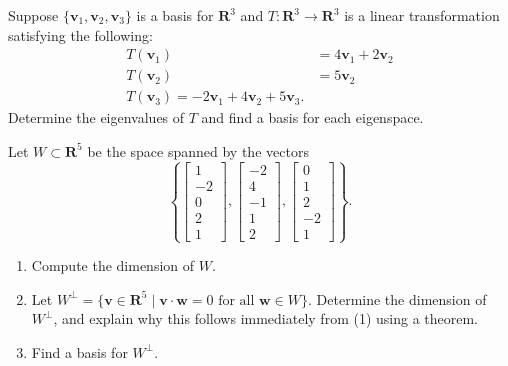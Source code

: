 \documentclass[11pt,twoside,openany]{memoir}
\begin{document}
    \begin{exercise}
        Suppose $\{\mathbf{v}_1,\mathbf{v}_2,\mathbf{v}_3\}$ is a basis for $\mathbf{R}^3$ and $T:\mathbf{R}^3\to \mathbf{R}^3$ is a linear transformation satisfying the following:
            \begin{equation*}
            \begin{split}
                T(\mathbf{v}_1) &= 4\mathbf{v}_1+2\mathbf{v}_2 \\
                T(\mathbf{v}_2) &= 5\mathbf{v}_2 \\
                T(\mathbf{v}_3) = -2\mathbf{v}_1+4\mathbf{v}_2+5\mathbf{v}_3.
            \end{split}
            \end{equation*}
        Determine the eigenvalues of $T$ and find a basis for each eigenspace.
        \end{exercise}
        
        \begin{exercise}
        Let $W\subset \mathbf{R}^5$ be the space spanned by the vectors
        \[
        \left\{\begin{bmatrix} 1 \\ -2 \\ 0 \\ 2 \\ 1 \end{bmatrix},\begin{bmatrix} -2 \\ 4 \\ -1 \\ 1 \\ 2\end{bmatrix}, \begin{bmatrix} 0 \\ 1 \\ 2 \\ -2 \\1\end{bmatrix}\right\}.\]

        \begin{enumerate}[label = (\arabic*)]
            \item Compute the dimension of $W$.
            \item Let $W^{\perp}=\{\mathbf{v}\in \mathbf{R}^5\mid \mathbf{v}\cdot \mathbf{w}=0 \text{ for all } \mathbf{w}\in W\}$. Determine the dimension of $W^{\perp}$, and explain why this follows immediately from (1) using a theorem.
            \item Find a basis for $W^{\perp}$.
        \end{enumerate}
        \end{exercise}
        
\end{document}
